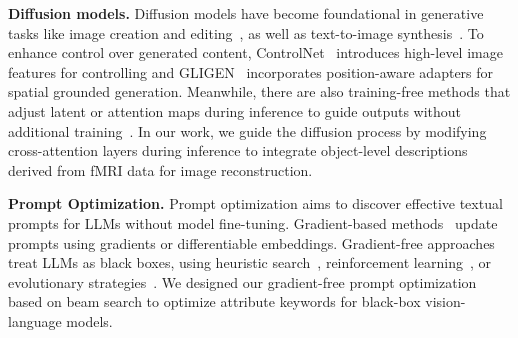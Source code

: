 
\textbf{Diffusion models.} Diffusion models have become foundational in generative tasks like image creation and editing~\citep{gal2022image, song2020denoising}, as well as text-to-image synthesis~\citep{ruiz2023dreambooth}. To enhance control over generated content, ControlNet~\citep{zhang2023adding} introduces high-level image features for controlling and GLIGEN~\citep{li2023gligen,zhang2025layercraft} incorporates position-aware adapters for spatial grounded generation. Meanwhile, there are also training-free methods that adjust latent or attention maps during inference to guide outputs without additional training~\citep{chen2024training, yang2024mastering}. In our work, we guide the diffusion process by modifying cross-attention layers during inference to integrate object-level descriptions derived from fMRI data for image reconstruction.

\textbf{Prompt Optimization.} Prompt optimization aims to discover effective textual prompts for LLMs without model fine-tuning. Gradient-based methods~\citep{shin2020autoprompt, shi2022toward, wen2023hard} update prompts using gradients or differentiable embeddings. Gradient-free approaches treat LLMs as black boxes, using heuristic search~\citep{prasad2022grips, pryzant2023automatic}, reinforcement learning~\citep{deng2022rlprompt, zhang2022tempera}, or evolutionary strategies~\citep{zhou2022large, yang2023large, guo2025evopromptconnectingllmsevolutionary}. We designed our gradient-free prompt optimization based on beam search to optimize attribute keywords for black-box vision-language models.


